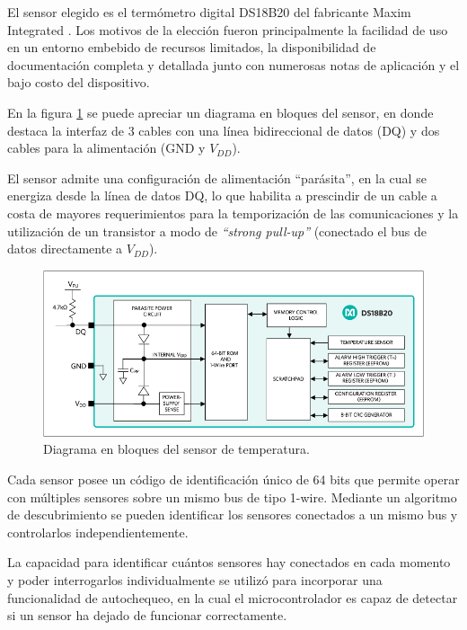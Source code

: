 El sensor elegido es el termómetro digital DS18B20 del fabricante Maxim Integrated \citep{ds18b20}. Los motivos de la elección fueron principalmente la facilidad de uso en un entorno embebido de recursos limitados, la disponibilidad de documentación completa y detallada junto con numerosas notas de aplicación y el bajo costo del dispositivo.

En la figura \ref{fig:ds18b20_bloques} se puede apreciar un diagrama en bloques del sensor, en donde destaca la interfaz de 3 cables con una línea bidireccional de datos (DQ) y dos cables para la alimentación (GND y $V_{DD}$). 

El sensor admite una configuración de alimentación ``parásita'', en la cual se energiza desde la línea de datos DQ, lo que habilita a prescindir de un cable a costa de mayores requerimientos para la temporización de las comunicaciones y la utilización de un transistor a modo de \textit{``strong pull-up''} (conectado el bus de datos directamente a $V_{DD}$).

\begin{figure}[ht]
	\centering
	\includegraphics[width=\textwidth]{./Figures/ds18b20_bloques.png}
	\caption[Diagrama en bloques del sensor de temperatura DS18B20]{Diagrama en bloques del sensor de temperatura\protect\footnotemark.}
	\label{fig:ds18b20_bloques}
\end{figure}


Cada sensor posee un código de identificación único de 64 bits que permite operar con múltiples sensores sobre un mismo bus de tipo 1-wire.  Mediante un algoritmo de descubrimiento se pueden identificar los sensores conectados a un mismo bus y controlarlos independientemente. 

La capacidad para identificar cuántos sensores hay conectados en cada momento y poder interrogarlos individualmente se utilizó para incorporar una funcionalidad de autochequeo, en la cual el microcontrolador es capaz de detectar si un sensor ha dejado de funcionar correctamente.

